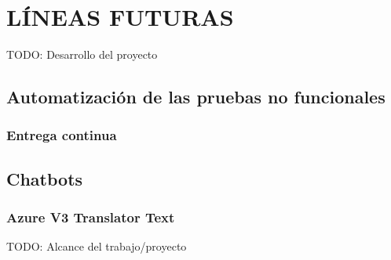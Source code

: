 \chapter{LÍNEAS FUTURAS\label{sec:lineasfuturas}}

TODO: Desarrollo del proyecto

\section{Automatización de las pruebas no funcionales}

\subsection{Entrega continua}

\section{Chatbots}

\subsection{Azure V3 Translator Text}

TODO: Alcance del trabajo/proyecto
